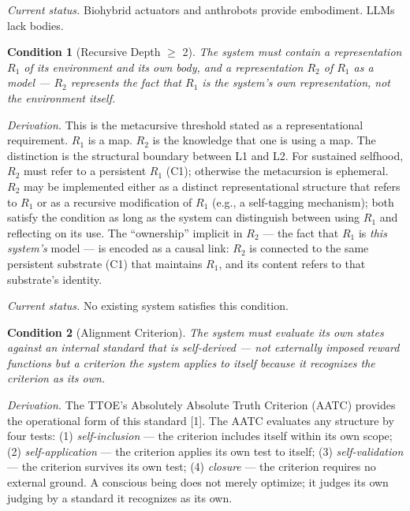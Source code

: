 \documentclass[12pt, letterpaper]{article}
\newtheorem{condition}{Condition}[section]
\begin{document}
\noindent\textit{Current status.} Biohybrid actuators and anthrobots provide embodiment. LLMs lack bodies.

\begin{condition}[Recursive Depth $\geq$ 2]
\label{cond:depth}
The system must contain a representation $R_1$ of its environment and its own body, and a representation $R_2$ of $R_1$ as a model --- $R_2$ represents the fact that $R_1$ is the system's own representation, not the environment itself.
\end{condition}

\noindent\textit{Derivation.} This is the metacursive threshold stated as a representational requirement. $R_1$ is a map. $R_2$ is the knowledge that one is using a map. The distinction is the structural boundary between L1 and L2. For sustained selfhood, $R_2$ must refer to a persistent $R_1$ (C1); otherwise the metacursion is ephemeral. $R_2$ may be implemented either as a distinct representational structure that refers to $R_1$ or as a recursive modification of $R_1$ (e.g., a self-tagging mechanism); both satisfy the condition as long as the system can distinguish between using $R_1$ and reflecting on its use. The ``ownership'' implicit in $R_2$ --- the fact that $R_1$ is \textit{this system's} model --- is encoded as a causal link: $R_2$ is connected to the same persistent substrate (C1) that maintains $R_1$, and its content refers to that substrate's identity.

\noindent\textit{Current status.} No existing system satisfies this condition.

\begin{condition}[Alignment Criterion]
\label{cond:alignment}
The system must evaluate its own states against an internal standard that is self-derived --- not externally imposed reward functions but a criterion the system applies to itself because it recognizes the criterion as its own.
\end{condition}

\noindent\textit{Derivation.} The TTOE's Absolutely Absolute Truth Criterion (AATC) provides the operational form of this standard [1]. The AATC evaluates any structure by four tests: (1) \textit{self-inclusion} --- the criterion includes itself within its own scope; (2) \textit{self-application} --- the criterion applies its own test to itself; (3) \textit{self-validation} --- the criterion survives its own test; (4) \textit{closure} --- the criterion requires no external ground. A conscious being does not merely optimize; it judges its own judging by a standard it recognizes as its own.
\end{document}
